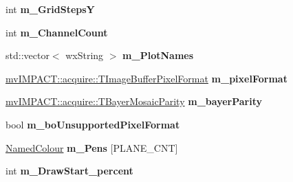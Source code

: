 \begin{DoxyCompactItemize}
\item 
\hypertarget{class_plot_canvas_image_analysis_a55c8e0fa361e33be822483b20ce3a2e8}{int {\bfseries m\+\_\+\+Grid\+Steps\+Y}}\label{class_plot_canvas_image_analysis_a55c8e0fa361e33be822483b20ce3a2e8}

\item 
\hypertarget{class_plot_canvas_image_analysis_aa95bfa2723ea25ba854bc8a34574ef68}{int {\bfseries m\+\_\+\+Channel\+Count}}\label{class_plot_canvas_image_analysis_aa95bfa2723ea25ba854bc8a34574ef68}

\item 
\hypertarget{class_plot_canvas_image_analysis_a1ce66c3d1b5ba105efb42638e43451eb}{std\+::vector$<$ wx\+String $>$ {\bfseries m\+\_\+\+Plot\+Names}}\label{class_plot_canvas_image_analysis_a1ce66c3d1b5ba105efb42638e43451eb}

\item 
\hypertarget{class_plot_canvas_image_analysis_a46e020fb299076e17f744445e3794065}{\hyperlink{group___common_interface_ga456e8aa76e06bb761f27c52141475985}{mv\+I\+M\+P\+A\+C\+T\+::acquire\+::\+T\+Image\+Buffer\+Pixel\+Format} {\bfseries m\+\_\+pixel\+Format}}\label{class_plot_canvas_image_analysis_a46e020fb299076e17f744445e3794065}

\item 
\hypertarget{class_plot_canvas_image_analysis_a12aa8da491f1359c373b8b295ef5519f}{\hyperlink{group___common_interface_ga9e2a1b46f3ed21b46b867c6d88d25598}{mv\+I\+M\+P\+A\+C\+T\+::acquire\+::\+T\+Bayer\+Mosaic\+Parity} {\bfseries m\+\_\+bayer\+Parity}}\label{class_plot_canvas_image_analysis_a12aa8da491f1359c373b8b295ef5519f}

\item 
\hypertarget{class_plot_canvas_image_analysis_aea5d213a8b343fb76a5e139d5c709b87}{bool {\bfseries m\+\_\+bo\+Unsupported\+Pixel\+Format}}\label{class_plot_canvas_image_analysis_aea5d213a8b343fb76a5e139d5c709b87}

\item 
\hypertarget{class_plot_canvas_image_analysis_aec57561055883e01312d6f9145f932a1}{\hyperlink{struct_plot_canvas_image_analysis_1_1_named_colour}{Named\+Colour} {\bfseries m\+\_\+\+Pens} \mbox{[}P\+L\+A\+N\+E\+\_\+\+C\+N\+T\mbox{]}}\label{class_plot_canvas_image_analysis_aec57561055883e01312d6f9145f932a1}

\item 
\hypertarget{class_plot_canvas_image_analysis_a912ed5e5bbd9bbf02b47a716b906af04}{int {\bfseries m\+\_\+\+Draw\+Start\+\_\+percent}}\label{class_plot_canvas_image_analysis_a912ed5e5bbd9bbf02b47a716b906af04}


\end{DoxyCompactItemize}
